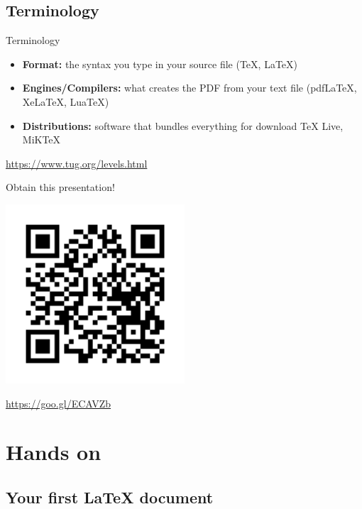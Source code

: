 \documentclass[inputenc]{beamer}
\begin{document}
\subsection{Terminology}

\begin{frame}{Terminology}
    
    \begin{itemize}
        \item \textbf{Format:} the syntax you type in your source file (\TeX{}, \LaTeX{})
        \item \textbf{Engines/Compilers:} what creates the PDF from your text file (pdf\LaTeX{}, Xe\LaTeX{}, Lua\TeX{})
        \item \textbf{Distributions:} software that bundles everything for download \TeX{} Live, MiK\TeX{}
    \end{itemize}
    
    \vspace{1cm}
    
    \centering
    \url{https://www.tug.org/levels.html}
    
\end{frame}

\begin{frame}{Obtain this presentation!}

    \centering
    \includegraphics[width=0.5\textwidth]{overleaf_QR}
    
    \url{https://goo.gl/ECAVZb}
    
\end{frame}

\section{Hands on}

\subsection{Your first \LaTeX{} document}
\end{document}

